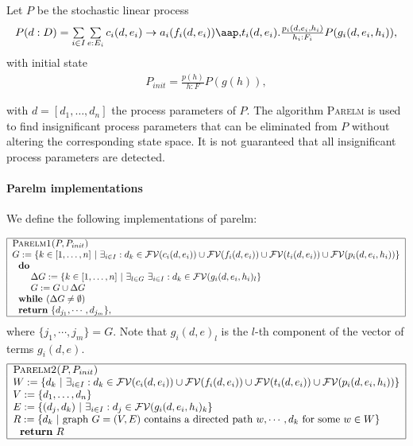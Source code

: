                       

Let $P$ be the stochastic linear process%
\[
\begin{array}{l}
P(d:D)=\sum\limits_{i\in I}\sum\limits_{e:E_{i}}c_{i}(d,e_{i})\rightarrow
a_{i}(f_{i}(d,e_{i}))\at t_{i}(d,e_{i}).\frac{p_{i}(d,e_{i},h_{i})}{%
h_{i}:F_{i}}P(g_{i}(d,e_{i},h_{i})),%
\end{array}%
\]%
with initial state%
\[
\begin{array}{l}
P_{init}=\frac{p(h)}{h:F}P(g(h)),%
\end{array}%
\]

with $d=[d_{1},\ldots ,d_{n}]$ the process parameters of $P$. The algorithm 
\textsc{Parelm} is used to find insignificant process parameters that can be
eliminated from $P$ without altering the corresponding state space. It is
not guaranteed that all insignificant process parameters are detected.

\paragraph{Parelm implementations}

We define the following implementations of parelm:

\[
\begin{tabular}{|l|}
\hline
\textsc{Parelm1(}$P,P_{init}$\textsc{)} \\ 
$G:=\{k\in \lbrack 1,\ldots ,n]\ |\ \exists _{i\in I}:d_{k}\in \mathcal{FV}%
(c_{i}(d,e_{i}))\cup \mathcal{FV}(f_{i}(d,e_{i}))\cup \mathcal{FV}%
(t_{i}(d,e_{i}))\cup \mathcal{FV}(p_{i}(d,e_{i},h_{i}))\}$ \\ 
$\text{\textbf{do}}$ \\ 
$\qquad \Delta G:=\{k\in \lbrack 1,\ldots ,n]\ |\ \exists _{l\in G}\ \exists
_{i\in I}:d_{k}\in \mathcal{FV}(g_{i}(d,e_{i},h_{i})_{l}\}$ \\ 
$\qquad G:=G\cup \Delta G$ \\ 
$\text{\textbf{while }}(\Delta G\neq \emptyset )$ \\ 
$\text{\textbf{return} }\{d_{j_{1}},\cdots ,d_{j_{m}}\},$ \\ \hline
\end{tabular}%
\]%
where $\{j_{1},\cdots ,j_{m}\}=G$. Note that $g_{i}(d,e)_{l}$ is the $l$-th
component of the vector of terms $g_{i}(d,e)$.%
\[
\begin{tabular}{|l|}
\hline
\textsc{Parelm2(}$P,P_{init}$\textsc{)} \\ 
$W:=\{d_{k}\ |\ \exists _{i\in I}:d_{k}\in \mathcal{FV}(c_{i}(d,e_{i}))\cup 
\mathcal{FV}(f_{i}(d,e_{i}))\cup \mathcal{FV}(t_{i}(d,e_{i}))\cup \mathcal{FV%
}(p_{i}(d,e_{i},h_{i}))\}$ \\ 
$V:=\{d_{1},\ldots ,d_{n}\}$ \\ 
$E:=\{(d_{j},d_{k})\ |\ \exists _{i\in I}:d_{j}\in \mathcal{FV}%
(g_{i}(d,e_{i},h_{i})_{k}\}$ \\ 
$R:=\{d_{k}\ |\ $graph $G=(V,E)$ contains a directed path $w,\cdots ,d_{k}$
for some $w\in W\}$ \\ 
$\text{\textbf{return} }R$ \\ \hline
\end{tabular}%
\]%
\newpage
